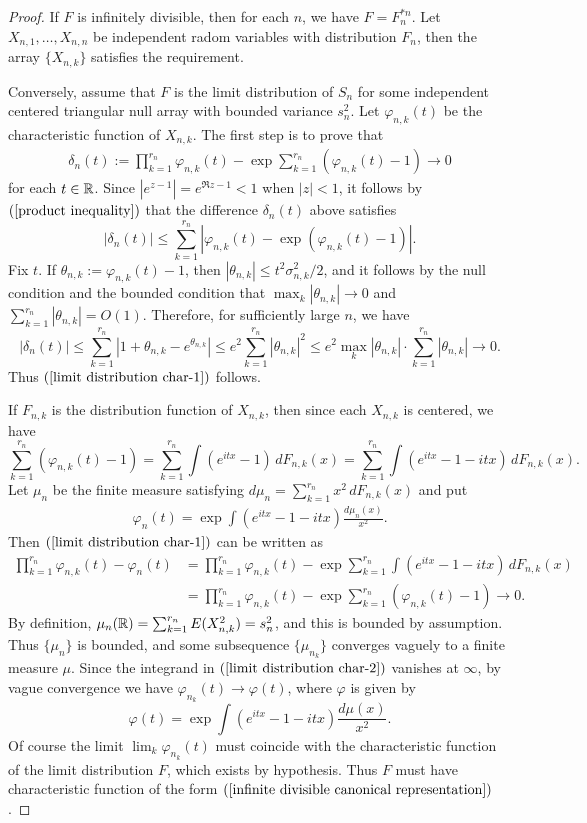 \begin{proof}
If $F$ is infinitely divisible, then for each $n$, we have $F=F_n^{\ast n}$. Let $X_{n,1},\dots,X_{n,n}$ be independent radom variables with distribution $F_n$, then the array $\{X_{n,k}\}$ satisfies the requirement.\par
Conversely, assume that $F$ is the limit distribution of $S_n$ for some independent centered triangular null array with bounded variance $s_n^2$. Let $\varphi_{n,k}(t)$ be the characteristic function of $X_{n,k}$. The first step is to prove that
\begin{align}\label{limit distribution char-1}
\delta_n(t):=\prod_{k=1}^{r_n}\varphi_{n,k}(t)-\exp\sum_{k=1}^{r_n}(\varphi_{n,k}(t)-1)\to 0
\end{align}
for each $t\in\mathbb{R}$. Since $|e^{z-1}|=e^{\Re z-1}<1$ when $|z|<1$, it follows by $(\ref{product inequality})$ that the difference $\delta_n(t)$ above satisfies
\[|\delta_n(t)|\leq\sum_{k=1}^{r_n}|\varphi_{n,k}(t)-\exp(\varphi_{n,k}(t)-1)|.\]
Fix $t$. If $\theta_{n,k}:=\varphi_{n,k}(t)-1$, then $|\theta_{n,k}|\leq t^2\sigma_{n,k}^2/2$, and it follows by the null condition and the bounded condition that $\max_k|\theta_{n,k}|\to 0$ and $\sum_{k=1}^{r_n}|\theta_{n,k}|=O(1)$. Therefore, for sufficiently large $n$, we have
\[|\delta_n(t)|\leq\sum_{k=1}^{r_n}|1+\theta_{n,k}-e^{\theta_{n,k}}|\leq e^2\sum_{k=1}^{r_n}|\theta_{n,k}|^2\leq e^2\max_k|\theta_{n,k}|\cdot\sum_{k=1}^{r_n}|\theta_{n,k}|\to 0.\]
Thus $(\ref{limit distribution char-1})$ follows.\par
If $F_{n,k}$ is the distribution function of $X_{n,k}$, then since each $X_{n,k}$ is centered, we have
\[\sum_{k=1}^{r_n}(\varphi_{n,k}(t)-1)=\sum_{k=1}^{r_n}\int(e^{itx}-1)\,dF_{n,k}(x)=\sum_{k=1}^{r_n}\int(e^{itx}-1-itx)\,dF_{n,k}(x).\]
Let $\mu_n$ be the finite measure satisfying $d\mu_n=\sum_{k=1}^{r_n}x^2\,dF_{n,k}(x)$ and put
\begin{align}\label{limit distribution char-2}
\varphi_n(t)=\exp\int(e^{itx}-1-itx)\frac{d\mu_n(x)}{x^2}.
\end{align}
Then $(\ref{limit distribution char-1})$ can be written as
\begin{align*}
\prod_{k=1}^{r_n}\varphi_{n,k}(t)-\varphi_n(t)&=\prod_{k=1}^{r_n}\varphi_{n,k}(t)-\exp\sum_{k=1}^{r_n}\int(e^{itx}-1-itx)\,dF_{n,k}(x)\\
&=\prod_{k=1}^{r_n}\varphi_{n,k}(t)-\exp\sum_{k=1}^{r_n}(\varphi_{n,k}(t)-1)\to 0.
\end{align*}
By definition, $\mu_n(\mathbb{R})=\sum_{k=1}^{r_n}E(X_{n,k}^2)=s_n^2$, and this is bounded by assumption. Thus $\{\mu_n\}$ is bounded, and some subsequence $\{\mu_{n_k}\}$ converges vaguely to a finite measure $\mu$. Since the integrand in $(\ref{limit distribution char-2})$ vanishes at $\infty$, by vague convergence we have $\varphi_{n_k}(t)\to\varphi(t)$, where $\varphi$ is given by 
\[\varphi(t)=\exp\int(e^{itx}-1-itx)\frac{d\mu(x)}{x^2}.\]
Of course the limit $\lim_k\varphi_{n_k}(t)$ must coincide with the characteristic function of the limit distribution $F$, which exists by hypothesis. Thus $F$ must have characteristic function of the form $(\ref{infinite divisible canonical representation})$.
\end{proof}
